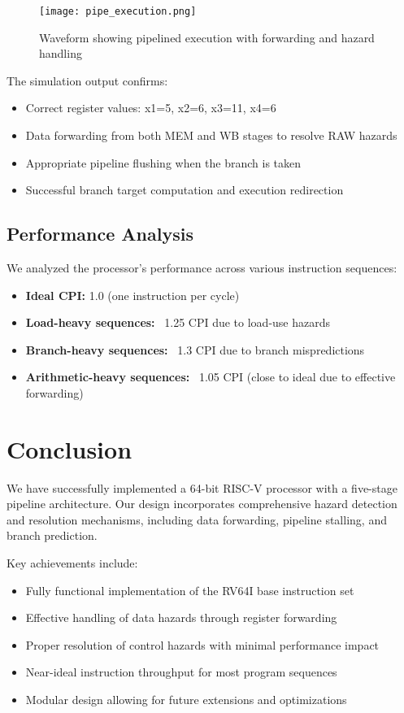 \documentclass[conference]{IEEEtran}
\begin{document}
\begin{figure}[H]
\centering
\texttt{[image: pipe\_execution.png]}
\caption{Waveform showing pipelined execution with forwarding and hazard handling}
\label{fig:pipe-execution}
\end{figure}

The simulation output confirms:
\begin{itemize}
    \item Correct register values: x1=5, x2=6, x3=11, x4=6
    \item Data forwarding from both MEM and WB stages to resolve RAW hazards
    \item Appropriate pipeline flushing when the branch is taken
    \item Successful branch target computation and execution redirection
\end{itemize}

\subsection{Performance Analysis}

We analyzed the processor's performance across various instruction sequences:

\begin{itemize}
    \item \textbf{Ideal CPI:} 1.0 (one instruction per cycle)
    \item \textbf{Load-heavy sequences:} ~1.25 CPI due to load-use hazards
    \item \textbf{Branch-heavy sequences:} ~1.3 CPI due to branch mispredictions
    \item \textbf{Arithmetic-heavy sequences:} ~1.05 CPI (close to ideal due to effective forwarding)
\end{itemize}

\section*{Conclusion}

We have successfully implemented a 64-bit RISC-V processor with a five-stage pipeline architecture. Our design incorporates comprehensive hazard detection and resolution mechanisms, including data forwarding, pipeline stalling, and branch prediction.

Key achievements include:
\begin{itemize}
    \item Fully functional implementation of the RV64I base instruction set
    \item Effective handling of data hazards through register forwarding
    \item Proper resolution of control hazards with minimal performance impact
    \item Near-ideal instruction throughput for most program sequences
    \item Modular design allowing for future extensions and optimizations
\end{itemize}
\end{document}
